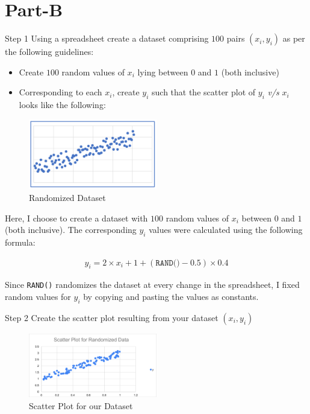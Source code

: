 \section{Part-B}

\begin{custombox}[label={box:step1}]{Step 1}
	Using a spreadsheet create a dataset comprising $100$ pairs $(x_i, y_i)$ as per the following guidelines:

	\begin{itemize}
		\item Create $100$ random values of $x_i$ lying between $0$ and $1$ (both inclusive)
		\item Corresponding to each $x_i$, create $y_i$ such that the scatter plot of $y_i$ \textit{v/s} $x_i$ looks like the following:
	\end{itemize}

	\begin{figure}[H]
		\centering
		\includegraphics[width=0.5\textwidth]{Images/Step1.png}
		\caption{Randomized Dataset}
	\end{figure}
\end{custombox}

Here, I choose to create a dataset with $100$ random values of $x_i$ between $0$ and $1$ (both inclusive). The corresponding $y_i$ values were calculated using the following formula:

\begin{align}
	y_i = 2 \times x_i + 1 + (\texttt{RAND()} - 0.5) \times 0.4
\end{align}

\begin{remark}
	Since \verb|RAND()| randomizes the dataset at every change in the spreadsheet, I fixed random values for $y_i$ by copying and pasting the values as constants.
\end{remark}

\begin{custombox}[label={box:step2}]{Step 2}
	Create the scatter plot resulting from your dataset $(x_i, y_i)$
\end{custombox}

\begin{figure}[H]
	\centering
	\includegraphics[width=0.5\textwidth]{Images/Step2.png}
	\caption{Scatter Plot for our Dataset}
\end{figure}

